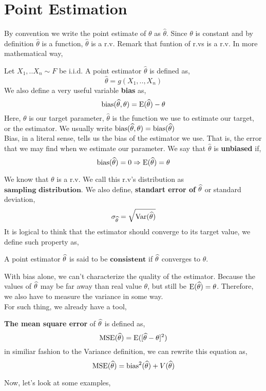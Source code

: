 \section{Point Estimation}
By convention we write the point estimate of $\theta$ as $\widehat{\theta}$. Since $\theta$ is constant and by definition $\widehat{\theta}$ is a function, $\widehat{\theta}$ is a r.v. Remark that funtion of r.vs is a r.v. In more mathematical way,
\begin{definition}
    Let $X_1,..X_n \sim F$ be i.i.d. A point estimator $\widehat{\theta}$ is defined as,
    \[\widehat{\theta} = g(X_1,..,X_n)\]
    We also define a very useful variable \textbf{bias} as,
    \[\operatorname{bias}(\widehat{\theta}, \theta) = \operatorname{E}(\widehat{\theta}) - \theta\]
    Here, $\theta$ is our target parameter, $\widehat{\theta}$ is the function we use to estimate our target, or the estimator. We usually write $\operatorname{bias}(\widehat{\theta},\theta) = \operatorname{bias}(\widehat{\theta})$ 
    \\
    Bias, in a literal sense, tells us the bias of the estimator we use. That is, the error that we may find when we estimate our parameter. We say that $\widehat{\theta}$ is \textbf{unbiased} if,
    \[\operatorname{bias} (\widehat{\theta}) = 0 \Rightarrow {\operatorname{E}}(\widehat{\theta}) = \theta \]
\end{definition}
We know that $\theta$ is a r.v. We call this r.v's distribution as $\textbf{sampling distribution}$. We also define,
\textbf{standart error of} ${\widehat{\theta}}$ or standard deviation,
\[\sigma_{{\widehat{\theta}}}= \sqrt{{\operatorname{Var}}({\widehat{\theta}})}\]
It is logical to think that the estimator should converge to its target value, we define such property as,
\begin{definition}
    A point estimator ${\widehat{\theta}}$ is said to be $\textbf{consistent}$ if  ${\widehat{\theta}}$ converges to $\theta$.
\end{definition}

\par
With bias alone, we can't characterize the quality of the estimator. Because the values of ${\widehat{\theta}}$ may be far away than real value $\theta$, but still be ${\operatorname{E}}({\widehat{\theta}}) = \theta$. Therefore, we also have to measure the variance in some way.
\\
For such thing, we already have a tool,
\begin{definition}
    \textbf{The mean square error} of ${\widehat{\theta}}$ is defined as,
    \[\operatorname{MSE}({\widehat{\theta}}) = {\operatorname{E}}([{\widehat{\theta}} - \theta]^2)\]
    in similiar fashion to the Variance definition, we can rewrite this equation as,
    \[\operatorname{MSE}({\widehat{\theta}}) =\operatorname{bias}^2({\widehat{\theta}}) + V({\widehat{\theta}})\]
\end{definition}
Now, let's look at some examples,
